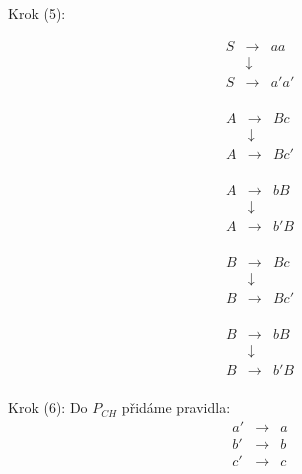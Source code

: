 \documentclass[a4paper,11pt]{article}[24.3.2010]
\begin{document}
\begin{enumerate}
\begin{enumerate}
      Krok (5):\\
      \begin{minipage}{.2\linewidth}
      \begin{eqnarray*}
       S&\rightarrow&aa\\
        &\downarrow&\\
       S&\rightarrow&a'a'\\
      \end{eqnarray*}
      \end{minipage}%
      \begin{minipage}{.2\linewidth}
      \begin{eqnarray*}
       A&\rightarrow&Bc\\
        &\downarrow&\\
       A&\rightarrow&Bc'\\
      \end{eqnarray*}
      \end{minipage}
      \begin{minipage}{.2\linewidth}
      \begin{eqnarray*}
       A&\rightarrow&bB\\
        &\downarrow&\\
       A&\rightarrow&b'B\\
      \end{eqnarray*}
      \end{minipage}
      \begin{minipage}{.2\linewidth}
      \begin{eqnarray*}
       B&\rightarrow&Bc\\
        &\downarrow&\\
       B&\rightarrow&Bc'\\
      \end{eqnarray*}
      \end{minipage}%
      \begin{minipage}{.2\linewidth}
      \begin{eqnarray*}
       B&\rightarrow&bB\\
        &\downarrow&\\
       B&\rightarrow&b'B\\
      \end{eqnarray*}
      \end{minipage}

      Krok (6): Do $P_{CH}$ přidáme pravidla:
      \begin{eqnarray*}
       a'&\rightarrow&a\\
       b'&\rightarrow&b\\
       c'&\rightarrow&c\\
      \end{eqnarray*}


\end{enumerate}
\end{enumerate}
\end{document}
